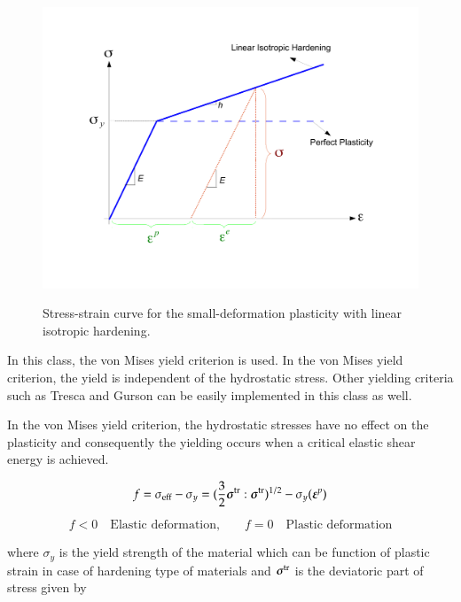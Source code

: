 \noindent 
\begin{figure}[htp]
  \centering
   {\includegraphics[scale=0.4, clip]{figures/isotropic_hardening_plasticity.pdf}}
   \caption{
    Stress-strain curve for the small-deformation plasticity with linear isotropic hardening.
   }
  \label{fig:smm:cl:Lin-strain-hard}
\end{figure}

\noindent In this class, the von Mises yield criterion is used. In the von Mises yield criterion, the yield is independent of the hydrostatic stress. Other yielding criteria such as Tresca and Gurson can be easily implemented in this class as well.

In the von Mises yield criterion, the hydrostatic stresses have no effect on the plasticity and consequently the yielding occurs when a critical elastic shear energy is achieved.

\begin{equation} \label{eqn:smm:constitutive:von Mises}
	f = \sigma_{{\mathrm{eff}}} - \sigma_y = (\frac{3}{2} {\boldsymbol{\sigma}}^{{\mathrm{tr}}} : {\boldsymbol{\sigma}}^{{\mathrm{tr}}})^{1/2}-\sigma_y (\boldsymbol{\varepsilon}^p)
\end{equation}

\begin{equation} \label{eqn:smm:constitutive:yielding}
 	f < 0 \quad \textrm{Elastic deformation,} \qquad f = 0 \quad  \textrm{Plastic deformation}
\end{equation}

where $\sigma_y$ is the yield strength of the material which can be function of plastic strain in case of hardening type of materials and ${\boldsymbol{\sigma}}^{{\mathrm{tr}}}$ is the deviatoric part of stress given by

